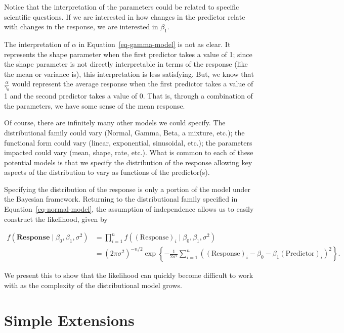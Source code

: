 \documentclass[
  letterpaper,
  DIV=11,
  numbers=noendperiod]{scrreprt}
\theoremstyle{definition}
\theoremstyle{plain}
\theoremstyle{definition}
\theoremstyle{remark}
\begin{document}
Notice that the interpretation of the parameters could be related to
specific scientific questions. If we are interested in how changes in
the predictor relate with changes in the response, we are interested in
\(\beta_1\).

The interpretation of \(\alpha\) in Equation~\ref{eq-gamma-model} is not
as clear. It represents the shape parameter when the first predictor
takes a value of 1; since the shape parameter is not directly
interpretable in terms of the response (like the mean or variance is),
this interpretation is less satisfying. But, we know that
\(\frac{\alpha}{\gamma_0}\) would represent the average response when
the first predictor takes a value of 1 and the second predictor takes a
value of 0. That is, through a combination of the parameters, we have
some sense of the mean response.

Of course, there are infinitely many other models we could specify. The
distributional family could vary (Normal, Gamma, Beta, a mixture, etc.);
the functional form could vary (linear, exponential, sinusoidal, etc.);
the parameters impacted could vary (mean, shape, rate, etc.). What is
common to each of these potential models is that we specify the
distribution of the response allowing key aspects of the distribution to
vary as functions of the predictor(s).

Specifying the distribution of the response is only a portion of the
model under the Bayesian framework. Returning to the distributional
family specified in Equation~\ref{eq-normal-model}, the assumption of
independence allows us to easily construct the likelihood, given by

\[
\begin{aligned}
  f\left(\mathbf{Response} \mid \beta_0, \beta_1, \sigma^2\right) 
    &= \prod_{i=1}^{n} f\left((\text{Response})_i \mid \beta_0, \beta_1, \sigma^2\right) \\
    &= \left(2\pi \sigma^2\right)^{-n/2} \exp\left\{-\frac{1}{2\sigma^2}\sum_{i=1}^{n} \left((\text{Response})_i - \beta_0 - \beta_1 (\text{Predictor})_i\right)^2\right\}.
\end{aligned}
\]

We present this to show that the likelihood can quickly become difficult
to work with as the complexity of the distributional model grows.

\hypertarget{simple-extensions}{%
\section{Simple Extensions}\label{simple-extensions}}
\end{document}
